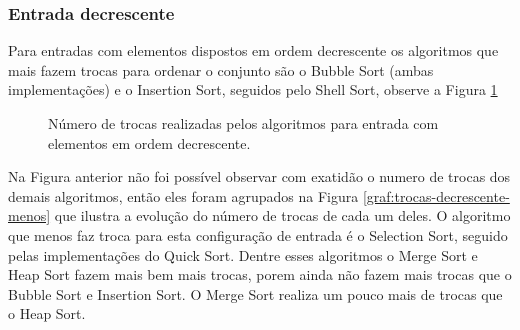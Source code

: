 \documentclass[conference,onecolumn]{IEEEtran}
\begin{document}
\subsubsection{Entrada decrescente}

Para entradas com elementos dispostos em ordem decrescente os algoritmos que mais fazem trocas para ordenar o conjunto são o Bubble Sort (ambas implementações) e o Insertion Sort, seguidos pelo Shell Sort, observe a Figura \ref{graf:trocas-decrescente}

\begin{figure}[H]
\begin{center}
\end{center}
\caption{Número de trocas realizadas pelos algoritmos para entrada com elementos em ordem decrescente.}
\label{graf:trocas-decrescente}
\end{figure}

Na Figura anterior não foi possível observar com exatidão o numero de trocas dos demais algoritmos, então eles foram agrupados na Figura \ref{graf:trocas-decrescente-menos} que ilustra a evolução do número de trocas de cada um deles. O algoritmo que menos faz troca para esta configuração de entrada é o Selection Sort, seguido pelas implementações do Quick Sort. Dentre esses algoritmos o Merge Sort e Heap Sort fazem mais bem mais trocas, porem ainda não fazem mais trocas que o Bubble Sort e Insertion Sort. O Merge Sort realiza um pouco mais de trocas que o Heap Sort.
\end{document}
